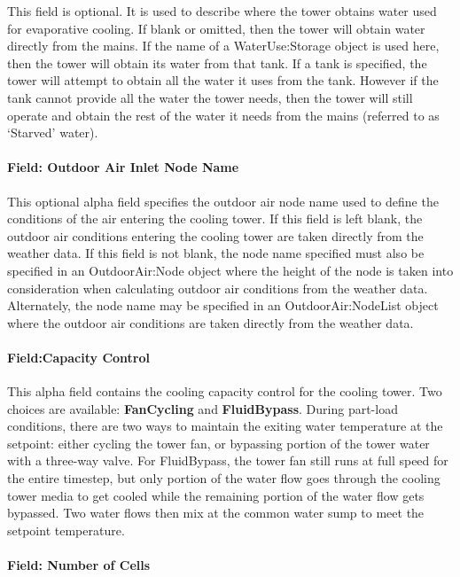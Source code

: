 This field is optional. It is used to describe where the tower obtains water used for evaporative cooling. If blank or omitted, then the tower will obtain water directly from the mains. If the name of a WaterUse:Storage object is used here, then the tower will obtain its water from that tank. If a tank is specified, the tower will attempt to obtain all the water it uses from the tank. However if the tank cannot provide all the water the tower needs, then the tower will still operate and obtain the rest of the water it needs from the mains (referred to as `Starved' water).

\paragraph{Field: Outdoor Air Inlet Node Name}\label{field-outdoor-air-inlet-node-name-000}

This optional alpha field specifies the outdoor air node name used to define the conditions of the air entering the cooling tower. If this field is left blank, the outdoor air conditions entering the cooling tower are taken directly from the weather data. If this field is not blank, the node name specified must also be specified in an OutdoorAir:Node object where the height of the node is taken into consideration when calculating outdoor air conditions from the weather data. Alternately, the node name may be specified in an OutdoorAir:NodeList object where the outdoor air conditions are taken directly from the weather data.

\paragraph{Field:Capacity Control}\label{fieldcapacity-control}

This alpha field contains the cooling capacity control for the cooling tower. Two choices are available: \textbf{FanCycling} and \textbf{FluidBypass}. During part-load conditions, there are two ways to maintain the exiting water temperature at the setpoint: either cycling the tower fan, or bypassing portion of the tower water with a three-way valve. For FluidBypass, the tower fan still runs at full speed for the entire timestep, but only portion of the water flow goes through the cooling tower media to get cooled while the remaining portion of the water flow gets bypassed. Two water flows then mix at the common water sump to meet the setpoint temperature.

\paragraph{Field: Number of Cells}\label{field-number-of-cells}

